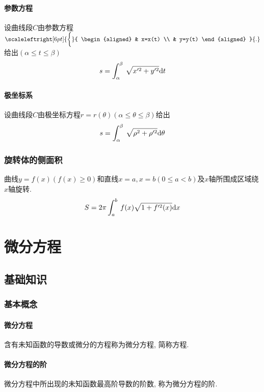 \subsubsection{参数方程}
设曲线段$ C $由参数方程$
    \scaleleftright[6pt]{\biggl\{}{
        \begin{aligned}
             & x=x(t) \\
             & y=y(t)
        \end{aligned}
    }{.} $给出$ (\alpha\le t\le \beta) $
\begin{equation*}
    s=\displaystyle\int_{\alpha}^{\beta}\hspace{.2em}\sqrt{x'^{2}+y'^{2}}\mathrm{d}t
\end{equation*}
\subsubsection{极坐标系}
设曲线段$ C $由极坐标方程$ r=r(\theta)(\alpha\le \theta\le \beta) $给出
\begin{equation*}
    s=\displaystyle\int_{\alpha}^{\beta}\hspace{.2em}\sqrt{\rho^{2}+\rho'^{2}}\mathrm{d}\theta
\end{equation*}
\subsection{旋转体的侧面积}
曲线$ y=f(x)(f(x)\ge 0) $和直线$ x=a, x=b(0\le a<b) $及$ x $轴所围成区域绕$ x $轴旋转.
\begin{equation*}
    S=2\pi\displaystyle\int_{a}^{b}\hspace{.2em}f(x)\sqrt{1+f'^{2}(x)}\mathrm{d}x
\end{equation*}
\chapter{微分方程}
\section{基础知识}
\subsection{基本概念}
\subsubsection{微分方程}
含有未知函数的导数或微分的方程称为微分方程, 简称方程.
\subsubsection{微分方程的阶}
微分方程中所出现的未知函数最高阶导数的阶数, 称为微分方程的阶.
